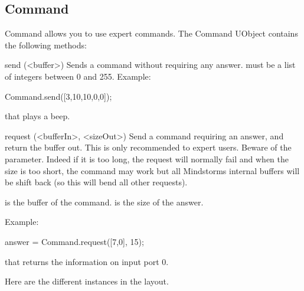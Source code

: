 \subsection{Command}

Command allows you to use expert commands. The Command UObject contains the
following methods:
\begin{urbiscriptapi}
\item[send](<buffer>) Sends a command without requiring any answer.
   must be a list of integers between 0 and 255.  Example:
\begin{urbiunchecked}
Command.send([3,10,10,0,0]);
\end{urbiunchecked}
\noindent
that plays a beep.

\item[request](<bufferIn>, <sizeOut>)%
  Send a command requiring an answer, and return the buffer out. This is
  only recommended to expert users. Beware of the 
  parameter. Indeed if it is too long, the request will normally fail and
  when the size is too short, the command may work but all Mindstorms
  internal buffers will be shift back (so this will bend all other
  requests).

   is the buffer of the command.  is the size of
  the answer.

  Example:
\begin{urbiunchecked}
answer = Command.request([7,0], 15);
\end{urbiunchecked}

that returns the information on input port 0.
\end{urbiscriptapi}

\let\subsection\subsectionOrig

\subsection{Instances}
Here are the different instances in the  layout.

